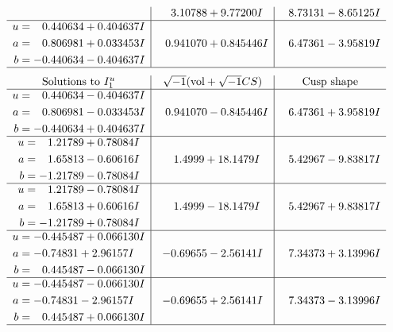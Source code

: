 \documentclass[1p]{elsarticle_modified}
\theoremstyle{definition}
\newcommand{\I}{\sqrt{-1}}
\begin{document}
$$\begin{array}{c|c|c}
 & \phantom{-}3.10788 + 9.77200 I & \phantom{-}8.73131 - 8.65125 I \\ \hline\begin{aligned}
u &= \phantom{-}0.440634 + 0.404637 I \\
a &= \phantom{-}0.806981 + 0.033453 I \\
b &= -0.440634 - 0.404637 I\end{aligned}
 & \phantom{-}0.941070 + 0.845446 I & \phantom{-}6.47361 - 3.95819 I\\
 \hline 
 \end{array}$$\newpage$$\begin{array}{c|c|c}  
\text{Solutions to }I^u_{1}& \I (\text{vol} + \sqrt{-1}CS) & \text{Cusp shape}\\
 \hline 
\begin{aligned}
u &= \phantom{-}0.440634 - 0.404637 I \\
a &= \phantom{-}0.806981 - 0.033453 I \\
b &= -0.440634 + 0.404637 I\end{aligned}
 & \phantom{-}0.941070 - 0.845446 I & \phantom{-}6.47361 + 3.95819 I \\ \hline\begin{aligned}
u &= \phantom{-}1.21789 + 0.78084 I \\
a &= \phantom{-}1.65813 - 0.60616 I \\
b &= -1.21789 - 0.78084 I\end{aligned}
 & \phantom{-}1.4999 + 18.1479 I & \phantom{-}5.42967 - 9.83817 I \\ \hline\begin{aligned}
u &= \phantom{-}1.21789 - 0.78084 I \\
a &= \phantom{-}1.65813 + 0.60616 I \\
b &= -1.21789 + 0.78084 I\end{aligned}
 & \phantom{-}1.4999 - 18.1479 I & \phantom{-}5.42967 + 9.83817 I \\ \hline\begin{aligned}
u &= -0.445487 + 0.066130 I \\
a &= -0.74831 + 2.96157 I \\
b &= \phantom{-}0.445487 - 0.066130 I\end{aligned}
 & -0.69655 - 2.56141 I & \phantom{-}7.34373 + 3.13996 I \\ \hline\begin{aligned}
u &= -0.445487 - 0.066130 I \\
a &= -0.74831 - 2.96157 I \\
b &= \phantom{-}0.445487 + 0.066130 I\end{aligned}
 & -0.69655 + 2.56141 I & \phantom{-}7.34373 - 3.13996 I\\
 \hline 
 \end{array}$$\newpage\newpage\renewcommand{\arraystretch}{1}
\end{document}
